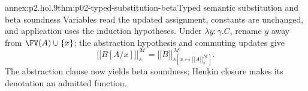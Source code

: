 \begin{annexitem}{annex:p2.hol.9}{thm:p02-typed-substitution-beta}{Typed semantic substitution and beta soundness}
Variables read the updated assignment, constants are unchanged, and
application uses the induction hypotheses.  Under
\(\lambda y{:}\gamma.C\), rename \(y\) away from
\(\FV(A)\cup\{x\}\); the abstraction hypothesis and commuting updates give
\[
 \lbrack\!\lbrack B[A/x]\rbrack\!\rbrack_s^{\mathcal M}
 =\lbrack\!\lbrack B\rbrack\!\rbrack_{s[x\mapsto
      \lbrack\!\lbrack A\rbrack\!\rbrack_s^{\mathcal M}]}^{\mathcal M}.
\]
The abstraction clause now yields beta soundness; Henkin closure makes its
denotation an admitted function.
\end{annexitem}
